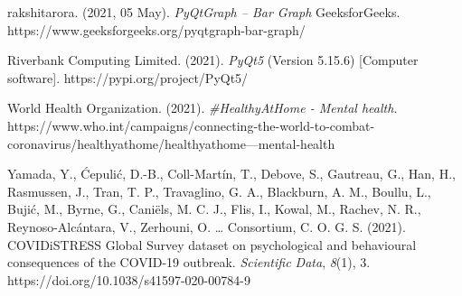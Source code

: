 \documentclass[fontsize=11pt]{article}
\begin{document}
    \hangindent=0.7cm \noindent
    rakshitarora. (2021, 05 May). \textit{PyQtGraph – Bar Graph} GeeksforGeeks.
    https://www.geeksforgeeks.org/pyqtgraph-bar-graph/

    \hangindent=0.7cm \noindent
    Riverbank Computing Limited. (2021). \textit{PyQt5} (Version 5.15.6) [Computer software].
    https://pypi.org/project/PyQt5/

    \hangindent=0.7cm \noindent
    World Health Organization. (2021). \textit{\#HealthyAtHome - Mental health}.
    https://www.who.int/campaigns/connecting-the-world-to-combat-coronavirus/healthyathome/healthyathome---mental-health

    \hangindent=0.7cm \noindent
    Yamada, Y., Ćepulić, D.-B., Coll-Martín, T., Debove, S., Gautreau, G., Han, H., Rasmussen, J., Tran, T. P., Travaglino, G. A., Blackburn, A. M., Boullu, L., Bujić, M., Byrne, G., Caniëls, M. C. J., Flis, I., Kowal, M., Rachev, N. R., Reynoso-Alcántara, V., Zerhouni, O. … Consortium, C. O. G. S. (2021). COVIDiSTRESS Global Survey dataset on psychological and behavioural consequences of the COVID-19 outbreak. \textit{Scientific Data}, \textit{8}(1), 3.
    https://doi.org/10.1038/s41597-020-00784-9
\end{document}
